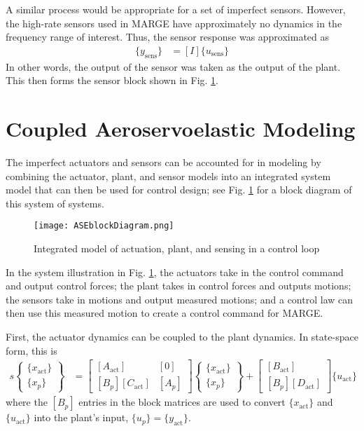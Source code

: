 A similar process would be appropriate for a set of imperfect sensors. However, the high-rate sensors used in MARGE have approximately no dynamics in the frequency range of interest. Thus, the sensor response was approximated as
\begin{align}
    \{y_\text{sens}\} &= [I] \{u_\text{sens}\}
\end{align}
In other words, the output of the sensor was taken as the output of the plant. This then forms the sensor block shown in Fig. \ref{fig:actPlantSens}.

\section{Coupled Aeroservoelastic Modeling}

The imperfect actuators and sensors can be accounted for in modeling by combining the actuator, plant, and sensor models into an integrated system model that can then be used for control design; see Fig. \ref{fig:actPlantSens} for a block diagram of this system of systems.
\begin{figure}[h]
    \centering
    \texttt{[image: ASEblockDiagram.png]}
    \label{fig:actPlantSens}
    \caption{Integrated model of actuation, plant, and sensing in a control loop}
\end{figure}
In the system illustration in Fig. \ref{fig:actPlantSens}, the actuators take in the control command and output control forces; the plant takes in control forces and outputs motions; the sensors take in motions and output measured motions; and a control law can then use this measured motion to create a control command for MARGE.

First, the actuator dynamics can be coupled to the plant dynamics. In state-space form, this is
\begin{align}
	\label{eq:coupledState}
	s \begin{Bmatrix} \{x_\text{act}\} \\ \{x_p\} \end{Bmatrix} &= \begin{bmatrix}
		[A_\text{act}] & [0] \\
		[B_p] [C_\text{act}] & [A_p]
	\end{bmatrix} \begin{Bmatrix} \{x_\text{act}\} \\ \{x_p\} \end{Bmatrix}
	+ \begin{bmatrix} [B_\text{act}] \\ [B_p][D_\text{act}] \end{bmatrix} \{u_\text{act}\}
\end{align}
where the $[B_p]$ entries in the block matrices are used to convert $\{x_\text{act}\}$ and $\{u_\text{act}\}$ into the plant's input, $\{u_p\}=\{y_\text{act}\}$.

